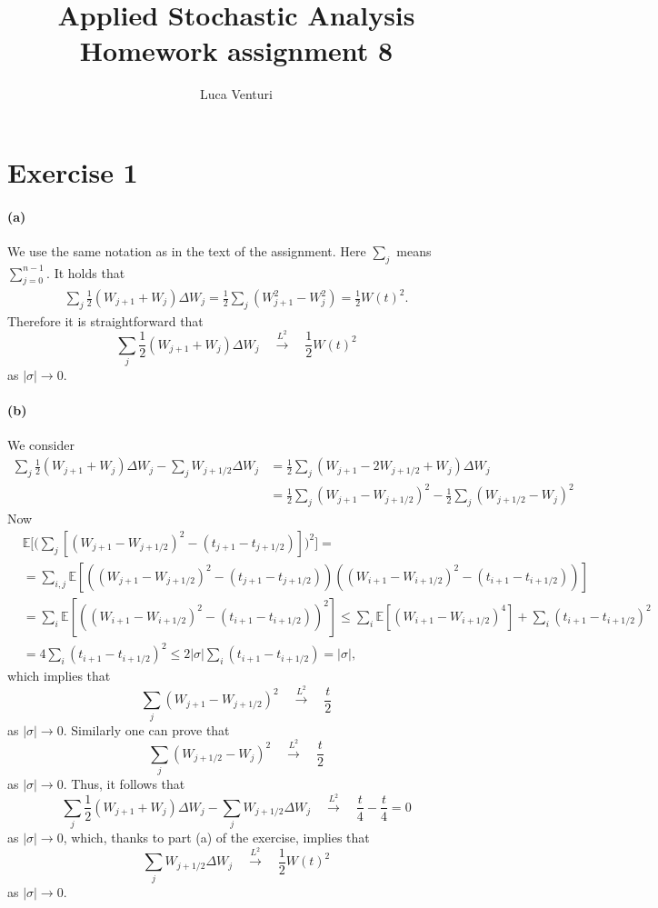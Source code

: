\documentclass[a4paper,11pt]{article}
\theoremstyle{definition}
\theoremstyle{plain}
\theoremstyle{remark}
\begin{document}
\title{Applied Stochastic Analysis \\ Homework assignment 8}
\author{Luca Venturi}
\maketitle

\section*{Exercise 1}

\paragraph*{(a)}

We use the same notation as in the text of the assignment. Here $\sum_j$ means $\sum_{j=0}^{n-1}$. It holds that
\begin{align*}
\sum_j\frac{1}{2}(W_{j+1}+W_j)\Delta W_j = \frac{1}{2}\sum_j(W_{j+1}^2-W_j^2) = \frac{1}{2}W(t)^2.
\end{align*}
Therefore it is straightforward that 
$$
\sum_j\frac{1}{2}(W_{j+1}+W_j)\Delta W_j \quad\xrightarrow{L^2}\quad \frac{1}{2}W(t)^2
$$
as $|\sigma|\to0$.

\paragraph*{(b)}

We consider 
\begin{align*}
\sum_j\frac{1}{2}(W_{j+1}+W_j)\Delta W_j - \sum_jW_{j+1/2}\Delta W_j & = \frac{1}{2}\sum_j(W_{j+1}-2W_{j+1/2}+W_j)\Delta W_j \\ & = \frac{1}{2}\sum_j(W_{j+1}-W_{j+1/2})^2 -\frac{1}{2}\sum_j(W_{j+1/2}-W_j)^2
\end{align*}
Now 
\begin{align*}
& \mathbb{E}\Big[\Big(\sum_j[(W_{j+1}-W_{j+1/2})^2-(t_{j+1}-t_{j+1/2})]\Big)^2\Big] = \\ & = \sum_{i,j}\mathbb{E}[((W_{j+1}-W_{j+1/2})^2-(t_{j+1}-t_{j+1/2}))((W_{i+1}-W_{i+1/2})^2-(t_{i+1}-t_{i+1/2}))] \\ & = \sum_i \mathbb{E}[((W_{i+1}-W_{i+1/2})^2-(t_{i+1}-t_{i+1/2}))^2] \leq \sum_i \mathbb{E}[(W_{i+1}-W_{i+1/2})^4] + \sum_i(t_{i+1}-t_{i+1/2})^2 \\ & = 4 \sum_i(t_{i+1}-t_{i+1/2})^2 \leq 2 |\sigma| \sum_i(t_{i+1}-t_{i+1/2}) = |\sigma|,
\end{align*}
which implies that 
$$
\sum_j(W_{j+1}-W_{j+1/2})^2 \quad\xrightarrow{L^2}\quad \frac{t}{2}
$$
as $|\sigma|\to0$.
Similarly one can prove that
$$
\sum_j(W_{j+1/2}-W_j)^2 \quad\xrightarrow{L^2}\quad \frac{t}{2}
$$
as $|\sigma|\to0$.
Thus, it follows that
$$
\sum_j\frac{1}{2}(W_{j+1}+W_j)\Delta W_j - \sum_jW_{j+1/2}\Delta W_j \quad\xrightarrow{L^2}\quad \frac{t}{4} - \frac{t}{4} = 0
$$
as $|\sigma|\to0$, which, thanks to part (a) of the exercise, implies that
$$
\sum_jW_{j+1/2}\Delta W_j \quad\xrightarrow{L^2}\quad \frac{1}{2}W(t)^2
$$
as $|\sigma|\to0$.
\end{document}
